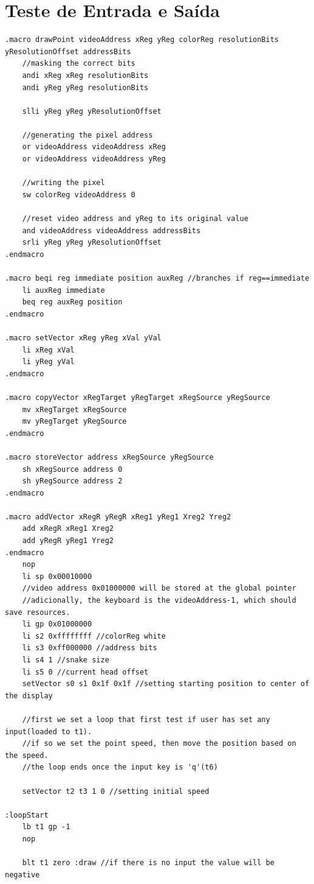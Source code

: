 \documentclass[
	12pt,				%
	openright,			%
	oneside,			%
	a4paper,			%
	english,			%
	french,				%
	spanish,			%
	brazil,				%
	]{abntex2}
\begin{document}
\chapter{Teste de Entrada e Saída}\label{ap:testeIO}
\begin{lstlisting}
.macro drawPoint videoAddress xReg yReg colorReg resolutionBits yResolutionOffset addressBits 
	//masking the correct bits
	andi xReg xReg resolutionBits
	andi yReg yReg resolutionBits
	
	slli yReg yReg yResolutionOffset
	
	//generating the pixel address
	or videoAddress videoAddress xReg
	or videoAddress videoAddress yReg
	
	//writing the pixel
	sw colorReg videoAddress 0
	
	//reset video address and yReg to its original value
	and videoAddress videoAddress addressBits
	srli yReg yReg yResolutionOffset
.endmacro
	
.macro beqi reg immediate position auxReg //branches if reg==immediate
	li auxReg immediate
	beq reg auxReg position
.endmacro 

.macro setVector xReg yReg xVal yVal
	li xReg xVal
	li yReg yVal
.endmacro

.macro copyVector xRegTarget yRegTarget xRegSource yRegSource
	mv xRegTarget xRegSource
	mv yRegTarget yRegSource
.endmacro

.macro storeVector address xRegSource yRegSource
	sh xRegSource address 0
	sh yRegSource address 2
.endmacro

.macro addVector xRegR yRegR xReg1 yReg1 Xreg2 Yreg2
	add xRegR xReg1 Xreg2
	add yRegR yReg1 Yreg2	
.endmacro
	nop
	li sp 0x00010000	
	//video address 0x01000000 will be stored at the global pointer 
	//adicionally, the keyboard is the videoAddress-1, which should save resources.
	li gp 0x01000000		
	li s2 0xffffffff //colorReg white	
	li s3 0xff000000 //address bits
	li s4 1 //snake size
	li s5 0 //current head offset
	setVector s0 s1 0x1f 0x1f //setting starting position to center of the display	
	
	//first we set a loop that first test if user has set any input(loaded to t1).
	//if so we set the point speed, then move the position based on the speed.
	//the loop ends once the input key is 'q'(t6)

	setVector t2 t3 1 0 //setting initial speed

:loopStart
	lb t1 gp -1
	nop
	
	blt t1 zero :draw //if there is no input the value will be negative 	
	

\end{lstlisting}
\end{document}
